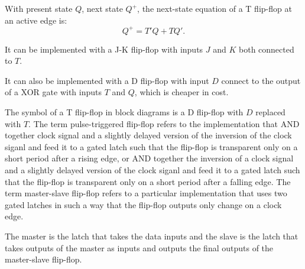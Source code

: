 \documentclass[a4paper,12pt]{report}
\begin{document}
With present state $Q$, next state $Q^+$, the next-state equation of a T flip-flop at an active edge is:
\[Q^+=T'Q+TQ'.\]

It can be implemented with a J-K flip-flop with inputs $J$ and $K$ both connected to $T$.

It can also be implemented with a D flip-flop with input $D$ connect to the output of a XOR gate with inputs $T$ and $Q$, which is cheaper in cost.

The symbol of a T flip-flop in block diagrams is a D flip-flop with $D$ replaced with $T$.
The term pulse-triggered flip-flop refers to the implementation that AND together clock signal and a slightly delayed version of the inversion of the clock siganl and feed it to a gated latch such that the flip-flop is transparent only on a short period after a rising edge, or AND together the inversion of a clock signal and a slightly delayed version of the clock siganl and feed it to a gated latch such that the flip-flop is transparent only on a short period after a falling edge.
The term master-slave flip-flop refers to a particular implementation that uses two gated latches in such a way that the flip-flop outputs only change on a clock edge.

The master is the latch that takes the data inputs and the slave is the latch that takes outputs of the master as inputs and outputs the final outputs of the master-slave flip-flop.
\end{document}
